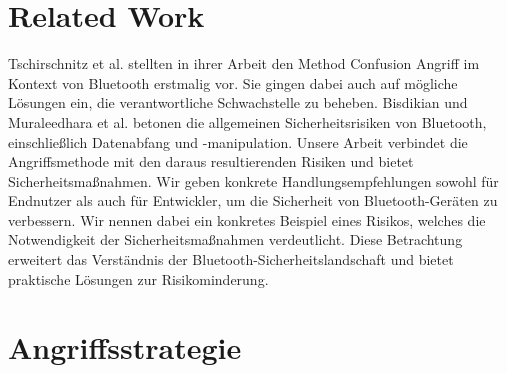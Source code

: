 \documentclass[
    a4paper,
    pagesize,
    pdftex,
    12pt,
]{scrartcl}
\begin{document}
        
    \section{Related Work}
    Tschirschnitz et al. \cite{method_confusion_attack} stellten in ihrer Arbeit den Method Confusion Angriff im Kontext von Bluetooth erstmalig vor. Sie gingen dabei auch auf mögliche Lösungen ein, die verantwortliche Schwachstelle zu beheben.
    Bisdikian und Muraleedhara et al. \cite{bluetooth_newest_security_risks} betonen die allgemeinen Sicherheitsrisiken von Bluetooth, einschließlich Datenabfang und -manipulation.
    Unsere Arbeit verbindet die Angriffsmethode mit den daraus resultierenden Risiken und bietet Sicherheitsmaßnahmen. Wir geben konkrete Handlungsempfehlungen sowohl für Endnutzer als auch für Entwickler, um die Sicherheit von Bluetooth-Geräten zu verbessern. Wir nennen dabei ein konkretes Beispiel eines Risikos, welches die Notwendigkeit der Sicherheitsmaßnahmen verdeutlicht.
    Diese Betrachtung erweitert das Verständnis der Bluetooth-Sicherheitslandschaft und bietet praktische Lösungen zur Risikominderung.

    \newpage



    \section{Angriffsstrategie}
\end{document}
